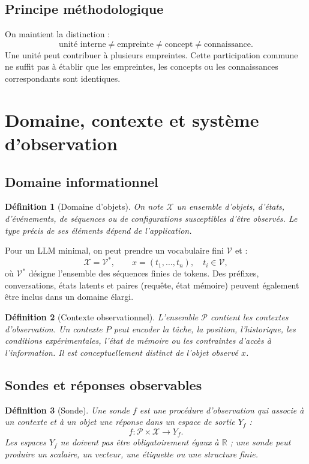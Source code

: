 \documentclass[11pt,a4paper]{article}
\newtheorem{definition}{Définition}[section]
\theoremstyle{remark}
\newcommand{\X}{\mathcal X}
\newcommand{\V}{\mathcal V}
\newcommand{\R}{\mathbb R}
\newcommand{\Pctx}{\mathcal P}
\newcommand{\1}{\mathbf 1}
\begin{document}
\subsection{Principe méthodologique}
On maintient la distinction :
\[
\boxed{\text{unité interne}\neq\text{empreinte}\neq\text{concept}\neq\text{connaissance}.}
\]
Une unité peut contribuer à plusieurs empreintes. Cette participation commune ne suffit pas à établir que les empreintes, les concepts ou les connaissances correspondants sont identiques.

\section{Domaine, contexte et système d'observation}

\subsection{Domaine informationnel}
\begin{definition}[Domaine d'objets]
On note $\X$ un ensemble d'objets, d'états, d'événements, de séquences ou de configurations susceptibles d'être observés. Le type précis de ses éléments dépend de l'application.
\end{definition}

Pour un LLM minimal, on peut prendre un vocabulaire fini $\V$ et :
\[
\X=\V^*,\qquad x=(t_1,\ldots,t_n),\quad t_i\in\V,
\]
où $\V^*$ désigne l'ensemble des séquences finies de tokens. Des préfixes, conversations, états latents et paires (requête, état mémoire) peuvent également être inclus dans un domaine élargi.

\begin{definition}[Contexte observationnel]
L'ensemble $\Pctx$ contient les contextes d'observation. Un contexte $P$ peut encoder la tâche, la position, l'historique, les conditions expérimentales, l'état de mémoire ou les contraintes d'accès à l'information. Il est conceptuellement distinct de l'objet observé $x$.
\end{definition}

\subsection{Sondes et réponses observables}
\begin{definition}[Sonde]
Une sonde $f$ est une procédure d'observation qui associe à un contexte et à un objet une réponse dans un espace de sortie $Y_f$ :
\[
f:\Pctx\times\X\to Y_f.
\]
Les espaces $Y_f$ ne doivent pas être obligatoirement égaux à $\R$ ; une sonde peut produire un scalaire, un vecteur, une étiquette ou une structure finie.
\end{definition}
\end{document}
